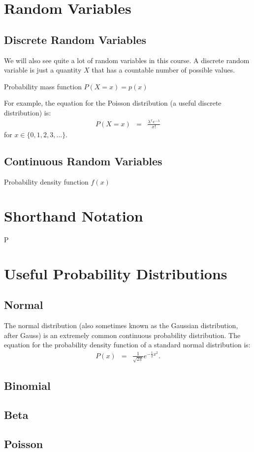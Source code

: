 \section{Random Variables}

\subsection{Discrete Random Variables}
We will also see quite a lot of random variables in this course. A discrete
random variable is just a quantity $X$ that has a countable number of possible
values.

Probability mass function
$P(X=x) = p(x)$

For example, the equation for the Poisson distribution (a useful discrete
distribution) is:
\begin{eqnarray}
P(X=x) &=& \frac{\lambda^x e^{-\lambda}}{x!}
\end{eqnarray}
for $x \in \{0, 1, 2, 3, ...\}$.

\subsection{Continuous Random Variables}
Probability density function
$f(x)$


\section{Shorthand Notation}

P

\section{Useful Probability Distributions}

\subsection{Normal}
The normal distribution (also sometimes known as the Gaussian distribution,
after Gauss) is an extremely common continuous probability distribution.
The equation for the probability density function of a standard normal
distribution is:
\begin{eqnarray}
P(x) &=& \frac{1}{\sqrt{2\pi}}e^{-\frac{1}{2}x^2}.
\end{eqnarray}

\subsection{Binomial}


\subsection{Beta}


\subsection{Poisson}


